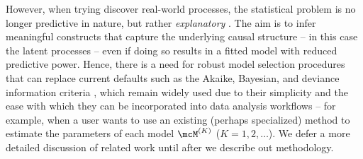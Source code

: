 However, when trying discover real-world processes, the statistical problem is no longer predictive in nature, but rather \emph{explanatory}  \citep{Shmueli:2010}.
The aim is to infer meaningful constructs that capture the underlying causal structure 
-- in this case the latent processes -- even if doing so results in a fitted model with reduced
predictive power.
Hence, there is a need for robust model selection procedures that can replace current defaults such as the Akaike, Bayesian, and deviance information criteria \citep{Akaike:1974,Schwarz:1978,Spiegelhalter:2002}, which remain widely used due to their simplicity and the ease with
which they can be incorporated into data analysis workflows -- for example, when a user wants to use an existing (perhaps specialized) method to estimate the parameters of each model $\model{K}$ ($K = 1, 2, \dots$).
We defer a more detailed discussion of related work until after we describe 
out methodology. 


